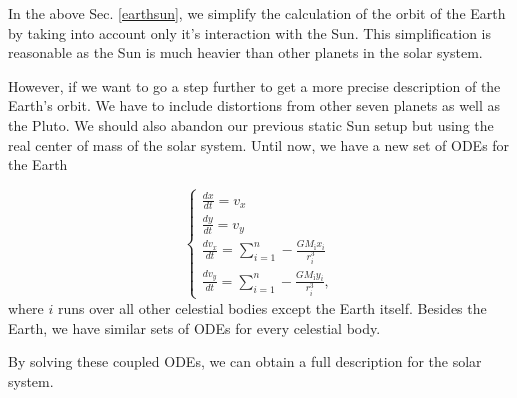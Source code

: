 In the above Sec. \ref{earthsun}, we simplify the calculation of the orbit of the Earth by taking into account only it's interaction with the Sun. 
This simplification is reasonable as the Sun is much heavier than other planets in the solar system. 

However, if we want to go a step further to get a more precise description of the Earth's orbit. 
We have to include distortions from other seven planets as well as the Pluto.
We should also abandon our previous static Sun setup but using the real center of mass of the solar system.
Until now, we have a new set of ODEs for the Earth

\begin{equation}
	\left\{  
             \begin{array}{lr}  
             	\frac{dx}{dt} = v_x \\
				\frac{dy}{dt} = v_y \\
            	\frac{dv_x}{dt} = \sum\limits_{i=1}^{n}-\frac{GM_{\mathrm{i}}x_i}{r_i^3} \\
				\frac{dv_y}{dt} = \sum\limits_{i=1}^{n}-\frac{GM_{\mathrm{i}}y_i}{r_i^3},
			\end{array}  
	\right. 	
\end{equation}
where $i$ runs over all other celestial bodies except the Earth itself. 
Besides the Earth, we have similar sets of ODEs for every celestial body.

By solving these coupled ODEs, we can obtain a full description for the solar system.
